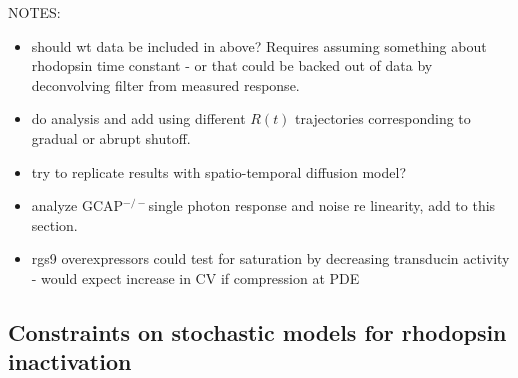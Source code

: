 \documentclass[12pt]{article}
\def\bi{\begin{itemize}}
\def\ei{\end{itemize}}
\def\i{\item}
\def\GCAPKO{GCAP$^{-/-}$}
\def\RKHET{GRK1$^{+/-}$}
\begin{document}

\bigskip
\noindent
NOTES:

\bi

\i{should wt data be included in above?  Requires assuming something about rhodopsin time constant - or that could be backed out of data by deconvolving filter from measured response.}

\i{do analysis and add using different $R(t)$ trajectories corresponding to gradual or abrupt shutoff.}

\i{try to replicate results with spatio-temporal diffusion model?}

\i{analyze \GCAPKO single photon response and noise re linearity, add to this section.}

\i{rgs9 overexpressors could test for saturation by decreasing transducin activity - would expect increase in CV if compression at PDE}

\ei


\subsection{Constraints on stochastic models for rhodopsin inactivation}
\end{document}
